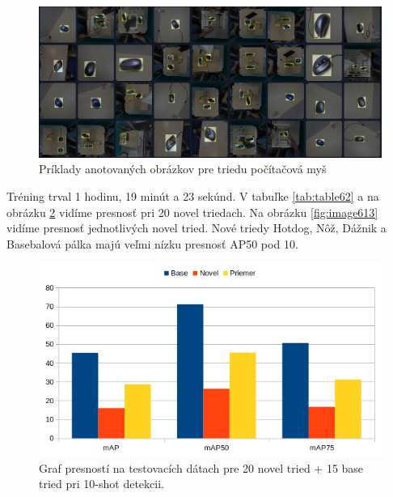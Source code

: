\begin{figure}[H]
\centering
\includegraphics[width=\textwidth]{images/computer_mouse_example_annotations.png}
\caption{Príklady anotovaných obrázkov pre triedu počítačová myš}
\label{fig:image6014}
\end{figure}

Tréning trval 1 hodinu, 19 minút a 23 sekúnd. V tabuľke \ref{tab:table62} a na obrázku \ref{fig:image65} vidíme presnosť pri 20 novel triedach. Na obrázku \ref{fig:image613} vidíme presnosť jednotlivých novel tried. Nové triedy Hotdog, Nôž, Dážnik a Basebalová pálka majú veľmi nízku presnosť AP50 pod 10.

\begin{figure}[H]
\centering
\includegraphics[width=\textwidth]{images/20novel_chart.png}
\caption{Graf presností na testovacích dátach pre 20 novel tried + 15 base tried pri 10-shot detekcii.}
\label{fig:image65}
\end{figure}

